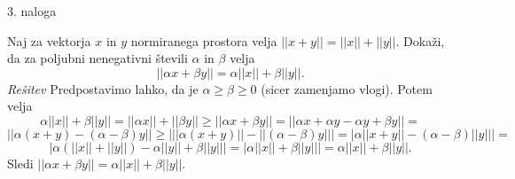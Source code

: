 \documentclass[a4paper, 12pt]{article}
\begin{document}
\begin{flushleft}
3. naloga
\end{flushleft}
Naj za vektorja $x$ in $y$ normiranega prostora velja $|| x+y|| = ||x|| + ||y||$. Dokaži, da za poljubni nenegativni števili $\alpha$ in $\beta$ velja
$$
||\alpha x + \beta y|| = \alpha ||x|| + \beta ||y||.
$$
\emph{Rešitev}
\newline
Predpostavimo lahko, da je $\alpha \ge \beta \ge 0$ (sicer zamenjamo vlogi). Potem velja 
$$
\alpha ||x|| + \beta ||y|| = ||\alpha x|| + ||\beta y|| \ge ||\alpha x + \beta y ||= ||\alpha x + \alpha y - \alpha y + \beta y||=
$$
$$
||\alpha (x+y) - (\alpha - \beta)y|| \ge \Big| ||\alpha(x+y) || - ||(\alpha - \beta)y|| \Big| = \Big| \alpha||x+y|| - (\alpha - \beta) ||y|| \Big|=
$$
$$
\Big| \alpha (||x|| + ||y||) - \alpha ||y|| + \beta ||y||\Big| = \Big| \alpha ||x|| + \beta ||y||\Big| = \alpha ||x|| + \beta ||y||.
$$
Sledi $||\alpha x + \beta y || = \alpha ||x|| + \beta ||y||$.
\end{document}
